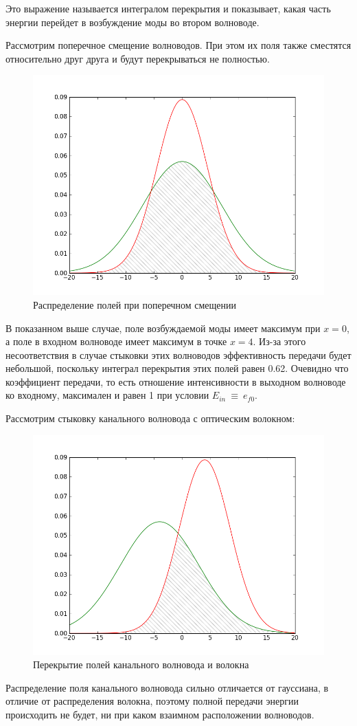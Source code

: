 Это выражение называется интегралом перекрытия  и показывает, какая часть энергии перейдет в возбуждение моды во втором волноводе. 

Рассмотрим поперечное смещение волноводов. При этом их поля также сместятся относительно друг друга и будут перекрываться не полностью.

\begin{figure}[h!]
	\includegraphics[width=.5\textwidth]{img/intersection.png}
	\caption{Распределение полей при поперечном смещении}
	\label{intersection}
\end{figure}

В показанном выше случае, поле возбуждаемой моды имеет максимум при $x=0$, а поле в входном волноводе имеет максимум в точке $x=4$. Из-за этого несоответствия в случае стыковки этих волноводов эффективность передачи будет небольшой, поскольку интеграл перекрытия этих полей равен 0.62. Очевидно что коэффициент передачи, то есть отношение интенсивности в выходном волноводе ко входному, максимален и равен 1 при условии $E_{in}~\equiv~e_{f0}$.

Рассмотрим стыковку канального волновода с оптическим волокном:

\begin{figure}[h!]
	\includegraphics[width=.5\textwidth]{img/intersection2.png}
	\caption{Перекрытие полей канального волновода и волокна}
\end{figure}

Распределение поля канального волновода сильно отличается от гауссиана, в отличие от распределения волокна, поэтому полной передачи энергии происходить не будет, ни при каком взаимном расположении волноводов.


